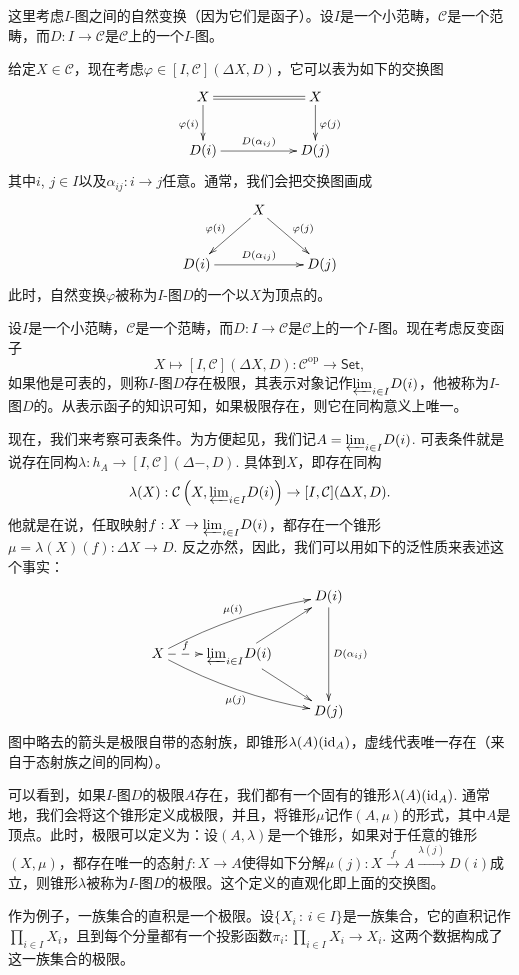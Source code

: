 \para 这里考虑$I$-图之间的自然变换（因为它们是函子）。设$I$是一个小范畴，$\mathcal{C}$是一个范畴，而$D:I\to \mathcal{C}$是$\mathcal{C}$上的一个$I$-图。

给定$X\in\mathcal{C}$，现在考虑$\varphi\in [I,\mathcal{C}](\Delta X,D)$，它可以表为如下的交换图
\[
	\xymatrix{
		X\ar@{=}[rr]\ar[d]_{\varphi(i)}&&X\ar[d]^{\varphi(j)}\\
		D(i)\ar[rr]^-{D(\alpha_{ij})}&&D(j)
	}
\]
其中$i$, $j\in I$以及$\alpha_{ij}:i\to j$任意。通常，我们会把交换图画成
\[
	\xymatrix{
		&X\ar[dl]_{\varphi(i)}\ar[dr]^{\varphi(j)}&\\
		D(i)\ar[rr]^-{D(\alpha_{ij})}&&D(j)
	}
\]
此时，自然变换$\varphi$被称为$I$-图$D$的一个以$X$为顶点的。

\para 设$I$是一个小范畴，$\mathcal{C}$是一个范畴，而$D:I\to \mathcal{C}$是$\mathcal{C}$上的一个$I$-图。现在考虑反变函子
\[
	X\mapsto [I,\mathcal{C}](\Delta X,D):\mathcal{C}^{\text{op}}\to \mathsf{Set},
\]
如果他是可表的，则称$I$-图$D$存在极限，其表示对象记作${\varprojlim}_{i\in I} D(i)$，他被称为$I$-图$D$的。从表示函子的知识可知，如果极限存在，则它在同构意义上唯一。

现在，我们来考察可表条件。为方便起见，我们记$A={\varprojlim}_{i\in I} D(i)$. 可表条件就是说存在同构$\lambda:h_{A}\to [I,\mathcal{C}](\Delta -,D)$. 具体到$X$，即存在同构
\[
	\lambda(X):\mathcal{C}\left(X,{\varprojlim}_{i\in I} D(i)\right)\to [I,\mathcal{C}](\Delta X,D).
\]
他就是在说，任取映射$f:X\to {\varprojlim}_{i\in I} D(i)$，都存在一个锥形$\mu=\lambda(X)(f):\Delta X\to D$. 反之亦然，因此，我们可以用如下的泛性质来表述这个事实：
\[
	\xymatrix{
		&&D(i)\ar[dd]^{D(\alpha_{ij})}\\
		X\ar@{-->}[r]^-{f}\ar@/^/[rru]^-{\mu(i)}\ar@/_/[rrd]_{\mu(j)}&{\varprojlim}_{i\in I} D(i)\ar[ru]\ar[rd]&\\
		&&D(j)
	}
\]
图中略去的箭头是极限自带的态射族，即锥形$\lambda(A)(\operatorname{id}_A)$，虚线代表唯一存在（来自于态射族之间的同构）。

可以看到，如果$I$-图$D$的极限$A$存在，我们都有一个固有的锥形$\lambda(A)(\operatorname{id}_A)$. 通常地，我们会将这个锥形定义成极限，并且，将锥形$\mu$记作$(A,\mu)$的形式，其中$A$是顶点。此时，极限可以定义为：设$(A,\lambda)$是一个锥形，如果对于任意的锥形$(X,\mu)$，都存在唯一的态射$f:X\to A$使得如下分解$\mu(j):X\xrightarrow{f}A\xrightarrow{\lambda(j)}D(i)$成立，则锥形$\lambda$被称为$I$-图$D$的极限。这个定义的直观化即上面的交换图。

作为例子，一族集合的直积是一个极限。设$\{X_i\,:\, i\in I\}$是一族集合，它的直积记作$\prod_{i\in I}X_i$，且到每个分量都有一个投影函数$\pi_i:\prod_{i\in I}X_i\to X_i$. 这两个数据构成了这一族集合的极限。

